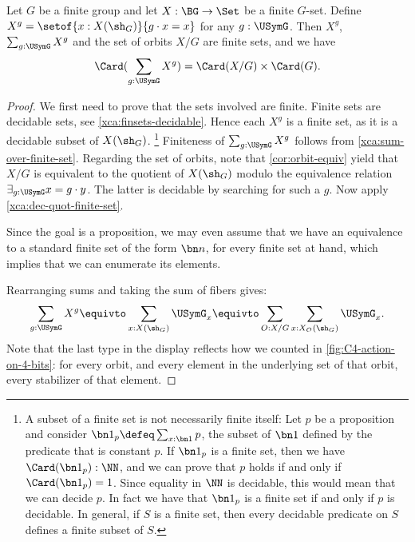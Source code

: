\begin{lemma}
  \label{lem:burnside}
  Let $G$ be a finite group and let $X:\BG\to\Set$ be a finite $G$-set.
  Define $X^g = \setof{x:X(\sh_G)}{g\cdot x = x}$ for any $g:\USymG$.
  Then $X^g$, $\sum_{g:\USymG} X^g$ and the set of orbits $X/G$
  are finite sets, and we have
  \[
    \Card(\sum_{g:\USymG} X^g) = \Card(X/G) \times \Card(G).
  \]
\end{lemma}
\begin{proof}
  We first need to prove that the sets involved are finite. 
  Finite sets are decidable sets, see \cref{xca:finsets-decidable}.
  Hence each $X^g$ is a finite set, as it is a decidable subset of $X(\sh_G)$.%
 \footnote{%
  A subset of a finite set is not necessarily finite itself:
  Let $p$ be a proposition and consider $\bn1_p\defeq\sum_{x:\bn1}p$,
  the subset of $\bn1$ defined by the predicate that is constant $p$.
  If $\bn1_p$ is a finite set, then we have 
  $\Card(\bn1_p) :\NN$, and we can prove that
  $p$ holds if and only if $\Card(\bn1_p) = 1$.
  Since equality in $\NN$ is decidable, this would mean that
  we can decide $p$. In fact we have that $\bn1_p$ is a finite set
  if and only if $p$ is decidable.
  In general, if $S$ is a finite set, then every
  decidable predicate on $S$ defines a finite subset of $S$.
 }
  Finiteness of $\sum_{g:\USymG} X^g$ follows from 
  \cref{xca:sum-over-finite-set}. Regarding the set of orbits,
  note that \cref{cor:orbit-equiv} yield that $X/G$ is equivalent
  to the quotient of $X(\sh_G)$ modulo the equivalence relation
  $\exists_{g:\USymG} x=g\cdot y$. The latter is decidable by
  searching for such a $g$. Now apply \cref{xca:dec-quot-finite-set}.
  
  Since the goal is a proposition, we may even assume that we have
  an equivalence to a standard finite set of the form $\bn n$,
  for every finite set at hand,
  which implies that we can enumerate its elements.
  
  Rearranging sums and taking the sum of fibers gives:
  \[
    \sum_{g:\USymG} X^g \equivto \sum_{x:X(\sh_G)} \USymG_x
    \equivto \sum_{O:X/G} \sum_{x : X_O(\sh_G)} \USymG_x.
  \]
  Note that the last type in the display reflects how
  we counted in \cref{fig:C4-action-on-4-bits}: for every orbit,
  and every element in the underlying set of that orbit, every
  stabilizer of that element. 
  
  

\end{proof}
